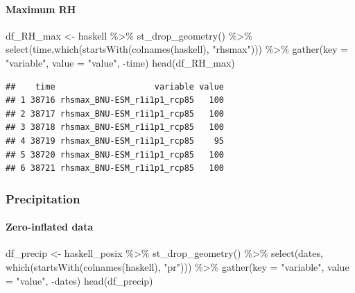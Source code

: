 \documentclass[
  paper=a4,
  ,captions=tableheading
]{scrartcl}
\newenvironment{Shaded}{\begin{snugshade}}{\end{snugshade}}
\newcommand{\AttributeTok}[1]{\textcolor[rgb]{0.77,0.63,0.00}{#1}}
\newcommand{\FunctionTok}[1]{\textcolor[rgb]{0.00,0.00,0.00}{#1}}
\newcommand{\NormalTok}[1]{#1}
\newcommand{\OtherTok}[1]{\textcolor[rgb]{0.56,0.35,0.01}{#1}}
\newcommand{\SpecialCharTok}[1]{\textcolor[rgb]{0.00,0.00,0.00}{#1}}
\newcommand{\StringTok}[1]{\textcolor[rgb]{0.31,0.60,0.02}{#1}}
\begin{document}
\hypertarget{maximum-rh}{%
\paragraph{Maximum RH}\label{maximum-rh}}

\begin{Shaded}
\begin{Highlighting}[]
\NormalTok{df\_RH\_max }\OtherTok{\textless{}{-}}\NormalTok{ haskell }\SpecialCharTok{\%\textgreater{}\%}
  \FunctionTok{st\_drop\_geometry}\NormalTok{() }\SpecialCharTok{\%\textgreater{}\%}
  \FunctionTok{select}\NormalTok{(time,}\FunctionTok{which}\NormalTok{(}\FunctionTok{startsWith}\NormalTok{(}\FunctionTok{colnames}\NormalTok{(haskell), }\StringTok{"rhsmax"}\NormalTok{))) }\SpecialCharTok{\%\textgreater{}\%}
  \FunctionTok{gather}\NormalTok{(}\AttributeTok{key =} \StringTok{"variable"}\NormalTok{, }\AttributeTok{value =} \StringTok{"value"}\NormalTok{, }\SpecialCharTok{{-}}\NormalTok{time)}
\FunctionTok{head}\NormalTok{(df\_RH\_max)}
\end{Highlighting}
\end{Shaded}

\begin{verbatim}
##    time                    variable value
## 1 38716 rhsmax_BNU-ESM_r1i1p1_rcp85   100
## 2 38717 rhsmax_BNU-ESM_r1i1p1_rcp85   100
## 3 38718 rhsmax_BNU-ESM_r1i1p1_rcp85   100
## 4 38719 rhsmax_BNU-ESM_r1i1p1_rcp85    95
## 5 38720 rhsmax_BNU-ESM_r1i1p1_rcp85   100
## 6 38721 rhsmax_BNU-ESM_r1i1p1_rcp85   100
\end{verbatim}

\hypertarget{precipitation}{%
\subsubsection{Precipitation}\label{precipitation}}

\hypertarget{zero-inflated-data}{%
\paragraph{Zero-inflated data}\label{zero-inflated-data}}

\begin{Shaded}
\begin{Highlighting}[]
\NormalTok{df\_precip }\OtherTok{\textless{}{-}}\NormalTok{ haskell\_posix }\SpecialCharTok{\%\textgreater{}\%}
  \FunctionTok{st\_drop\_geometry}\NormalTok{() }\SpecialCharTok{\%\textgreater{}\%}
  \FunctionTok{select}\NormalTok{(dates, }\FunctionTok{which}\NormalTok{(}\FunctionTok{startsWith}\NormalTok{(}\FunctionTok{colnames}\NormalTok{(haskell), }\StringTok{"pr"}\NormalTok{))) }\SpecialCharTok{\%\textgreater{}\%}
  \FunctionTok{gather}\NormalTok{(}\AttributeTok{key =} \StringTok{"variable"}\NormalTok{, }\AttributeTok{value =} \StringTok{"value"}\NormalTok{, }\SpecialCharTok{{-}}\NormalTok{dates)}
\FunctionTok{head}\NormalTok{(df\_precip)}
\end{Highlighting}
\end{Shaded}
\end{document}
